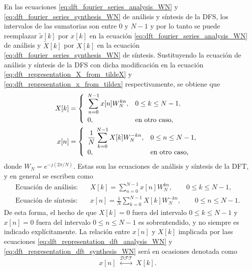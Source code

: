 \documentclass[a4paper]{report}
\begin{document}
En las ecuaciones \ref{eq:dft_fourier_series_analysis_WN} y \ref{eq:dft_fourier_series_synthesis_WN} de análisis y síntesis de la DFS, los intervalos de las sumatorias son entre 0 y \(N-1\) y por lo tanto se puede reemplazar \(\tilde{x}[k]\) por \(x[k]\) en la ecuación \ref{eq:dft_fourier_series_analysis_WN} de análisis y \(\tilde{X}[k]\) por \(X[k]\) en la ecuación \ref{eq:dft_fourier_series_synthesis_WN} de síntesis. Sustituyendo la ecuación de análisis y síntesis de la DFS con dicha modificación en la ecuación \ref{eq:dft_representation_X_from_tildeX} y \ref{eq:dft_representation_x_from_tildex} respectivamente, se obtiene que 
\begin{align*}
 X[k]&=
 \left\{
 \begin{array}{ll}
  \displaystyle\sum_{n=0}^{N-1}x[n]W_N^{kn}, & 0\leq k\leq N-1,\\[\bigskipamount]
  0, & \textrm{en otro caso,}
 \end{array}
 \right.\\    
 x[n]&=
 \left\{
 \begin{array}{ll}
  \displaystyle\frac{1}{N}\sum_{k=0}^{N-1}X[k]W_N^{-kn}, & 0\leq n\leq N-1,\\
  0, & \textrm{en otro caso,}
 \end{array}
 \right.  
\end{align*}
donde \(W_N=e^{-j(2\pi/N)}\). Estas son las ecuaciones de análisis y síntesis de la DFT, y en general se escriben como
\begin{align}
 \textrm{Ecuación de análisis:}&\quad X[k]=\sum_{n=0}^{N-1}x[n]W_N^{kn},\qquad 0\leq k\leq N-1,\label{eq:dft_representation_dft_analysis_WN}\\
 \textrm{Ecuación de síntesis:}&\quad x[n]=\frac{1}{N}\sum_{k=0}^{N-1}X[k]W_N^{-kn},\qquad0\leq n\leq N-1\label{eq:dft_representation_dft_synthesis_WN}.
\end{align}
De esta forma, el hecho de que \(X[k]=0\) fuera del intervalo \(0\leq k\leq N-1\) y \(x[n]=0\) fuera del intervalo \(0\leq n\leq N-1\) es sobrentendido, y no siempre es indicado explícitamente. La relación entre \(x[n]\) y \(X[k]\) implicada por lass ecuaciones \ref{eq:dft_representation_dft_analysis_WN} y \ref{eq:dft_representation_dft_synthesis_WN} será en ocasiones denotada como
\[
 x[n]\;\overset{\mathcal{DFT}}{\longleftrightarrow}\;X[k].
\]
\end{document}
